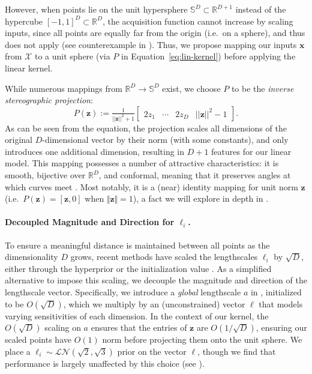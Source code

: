 \documentclass[twoside]{article}
\theoremstyle{plain}
\theoremstyle{definition}
\begin{document}
However, when points lie on the unit hypersphere $\mathbb{S}^{D} \subset \mathbb{R}^{D+1}$ instead of the hypercube $[-1, 1]^D \subset \mathbb{R}^D$, the acquisition function cannot increase by scaling inputs, since all points are equally far from the origin (i.e.\ on a sphere), and thus  does not apply (see counterexample in ).
Thus, we propose mapping our inputs $\mathbf x$ from $\mathcal X$ to a unit sphere (via $P$ in Equation~\ref{eq:lin-kernel}) before applying the linear kernel.

While numerous mappings from $\mathbb R^D \to \mathbb S^D$ exist, we choose $P$ to be the \emph{inverse stereographic projection}:
\begin{equation} \label{eq:inv-stereo}
    P(\mathbf{z}) := \tfrac{1}{||\mathbf{z}||^2 + 1} \begin{bmatrix}2 z_1 & \cdots  & 2 z_D & ||\mathbf{z}||^2 - 1\end{bmatrix}.
\end{equation}
As can be seen from the equation, the projection scales all dimensions of the original $D$-dimensional vector by their norm (with some constants), and only introduces one additional dimension, resulting in $D+1$ features for our linear model.
This mapping possesses a number of attractive characteristics: it is smooth, bijective over $\mathbb R^D$, and conformal, meaning that it preserves angles at which curves meet \citep{hilbert2021geometry}.
Most notably, it is a (near) identity mapping for unit norm $\mathbf z$ (i.e.\ $P(\mathbf z) = [\mathbf z, 0]$ when $\Vert \mathbf z \Vert = 1$), a fact we will explore in depth in .


\paragraph{Decoupled Magnitude and Direction for $\ell_i$.}
To ensure a meaningful distance is maintained between all points as the dimensionality $D$ grows, recent methods have scaled the lengthscales $\ell_i$ by $\sqrt{D}$, either through the hyperprior \citep{hvarfner2024vanilla,xu2025standard} or the initialization value \citep{papenmeier2025understanding}.
As a simplified alternative to impose this scaling,
we decouple the magnitude and direction of the lengthscale vector.
Specifically, we introduce a \emph{global} lengthscale $a$ in , initialized to be $O(\sqrt{D})$, which we multiply by an (unconstrained) vector $\boldsymbol \ell$ that models varying sensitivities of each dimension.
In the context of our kernel,
the $O(\sqrt D)$ scaling on $a$ ensures that the entries of $\mathbf z$ are $O(1/\sqrt{D})$, ensuring our scaled points have $O(1)$ norm before projecting them onto the unit sphere.
We place a $\ell_i \sim \mathcal{LN}\left(\sqrt{2}, \sqrt{3}\right)$ prior on the vector $\boldsymbol \ell$, though we find that performance is largely unaffected by this choice (see ).
\end{document}
